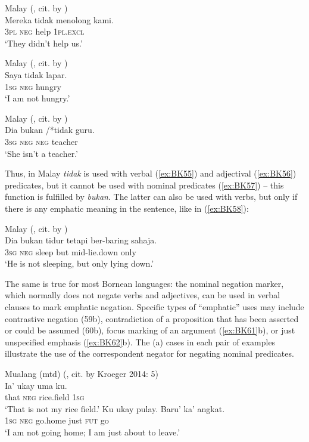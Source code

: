 \documentclass[output=paper]{langsci/langscibook}
\begin{document}
\ea Malay (\citealp[195]{sneddon1996a}, cit. by \citealp[1]{kroeger2014a}) \label{ex:BK55}\\
	\gll Mereka	tidak	menolong	kami.\\
	\textsc{3pl}			\textsc{neg}	help			\textsc{1pl.excl}\\
	\glt `They didn’t help us.'
\z

\ea Malay (\citealp[88]{sudaryono1993a}, cit. by \citealp[1]{kroeger2014a}) \label{ex:BK56}\\
	\gll Saya	tidak	lapar.\\
	\textsc{1sg}	\textsc{neg}	hungry\\
	\glt `I am not hungry.'
\z

\ea Malay (\citealp[195]{sneddon1996a}, cit. by \citealp[1]{kroeger2014a}) \label{ex:BK57}\\
	\gll Dia	bukan	/*tidak	guru.\\
	\textsc{3sg}	\textsc{neg}		\textsc{neg}		teacher\\
	\glt `She isn’t a teacher.'
\z


Thus, in Malay \textit{tidak} is used with verbal (\ref{ex:BK55}) and adjectival (\ref{ex:BK56}) predicates, but it cannot be used with nominal predicates (\ref{ex:BK57}) – this function is fulfilled by \textit{bukan}. The latter can also be used with verbs, but only if there is any emphatic meaning in the sentence, like in (\ref{ex:BK58}):

\ea Malay (\citealp[145]{asmahhj1982a}, cit. by \citealp[1]{kroeger2014a}) \label{ex:BK58}\\
	\gll Dia	bukan	tidur	tetapi		ber-baring		sahaja.\\
	\textsc{3sg}	\textsc{neg}		sleep	but		mid-lie.down	only\\
	\glt `He is not sleeping, but only lying down.'
\z

The same is true for most Bornean languages: the nominal negation marker, which normally does not negate verbs and adjectives, can be used in verbal clauses to mark emphatic negation. Specific types of “emphatic” uses may include contrastive negation (59b), contradiction of a proposition that has been asserted or could be assumed (60b), focus marking of an argument (\ref{ex:BK61}b), or just unspecified emphasis (\ref{ex:BK62}b). The (a) cases in each pair of examples illustrate the use of the correspondent negator for negating nominal predicates.

\ea Mualang (mtd) (\citealp[examples 9–102, 110]{tjia2007a}, cit. by Kroeger 2014: 5) \label{ex:BK59}\\
  \ea
	\gll Ia’		ukay	uma			ku.\\
	that	\textsc{neg}	rice.field	\textsc{1sg}\\
	\glt `That is not my rice field.'
  \ex
	\gll Ku		ukay	pulay.		Baru’		ka’	angkat.\\
	\textsc{1sg}	\textsc{neg}	go.home		just		\textsc{fut}	go\\
	\glt `I am not going home; I am just about to leave.'
\z \z
\end{document}
